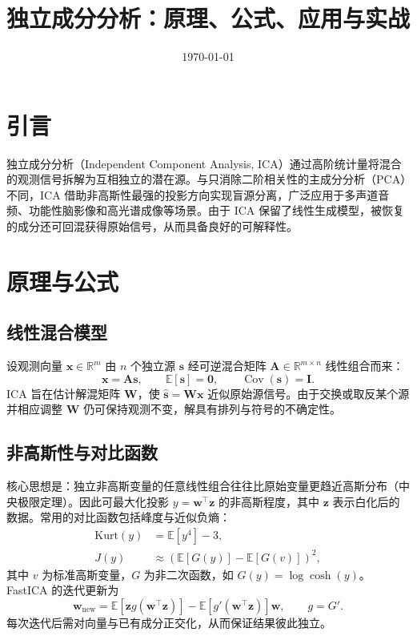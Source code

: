 \documentclass[UTF8,zihao=-4]{ctexart}
\title{独立成分分析：原理、公式、应用与实战}
\author{}
\date{\today}
\begin{document}
\maketitle

\section{引言}
独立成分分析（Independent Component Analysis, ICA）通过高阶统计量将混合的观测信号拆解为互相独立的潜在源。与只消除二阶相关性的主成分分析（PCA）不同，ICA 借助非高斯性最强的投影方向实现盲源分离，广泛应用于多声道音频、功能性脑影像和高光谱成像等场景。由于 ICA 保留了线性生成模型，被恢复的成分还可回混获得原始信号，从而具备良好的可解释性。

\section{原理与公式}
\subsection{线性混合模型}
设观测向量 \(\mathbf{x} \in \mathbb{R}^m\) 由 \(n\) 个独立源 \(\mathbf{s}\) 经可逆混合矩阵 \(\mathbf{A} \in \mathbb{R}^{m \times n}\) 线性组合而来：
\begin{equation}
\mathbf{x} = \mathbf{A}\mathbf{s}, \qquad \mathbb{E}[\mathbf{s}] = \mathbf{0}, \qquad \operatorname{Cov}(\mathbf{s}) = \mathbf{I}.
\end{equation}
ICA 旨在估计解混矩阵 \(\mathbf{W}\)，使 \(\hat{\mathbf{s}} = \mathbf{W}\mathbf{x}\) 近似原始源信号。由于交换或取反某个源并相应调整 \(\mathbf{W}\) 仍可保持观测不变，解具有排列与符号的不确定性。

\subsection{非高斯性与对比函数}
核心思想是：独立非高斯变量的任意线性组合往往比原始变量更趋近高斯分布（中央极限定理）。因此可最大化投影 \(y = \mathbf{w}^\top \mathbf{z}\) 的非高斯程度，其中 \(\mathbf{z}\) 表示白化后的数据。常用的对比函数包括峰度与近似负熵：
\begin{align}
\text{Kurt}(y) &= \mathbb{E}[y^4] - 3,\\
J(y) &\approx \left(\mathbb{E}[G(y)] - \mathbb{E}[G(v)]\right)^2,
\end{align}
其中 \(v\) 为标准高斯变量，\(G\) 为非二次函数，如 \(G(y)=\log \cosh(y)\)。FastICA 的迭代更新为
\begin{equation}
\mathbf{w}_{\text{new}} = \mathbb{E}[\mathbf{z}g(\mathbf{w}^\top\mathbf{z})] - \mathbb{E}[g'(\mathbf{w}^\top\mathbf{z})] \mathbf{w}, \qquad g = G'.
\end{equation}
每次迭代后需对向量与已有成分正交化，从而保证结果彼此独立。
\end{document}
